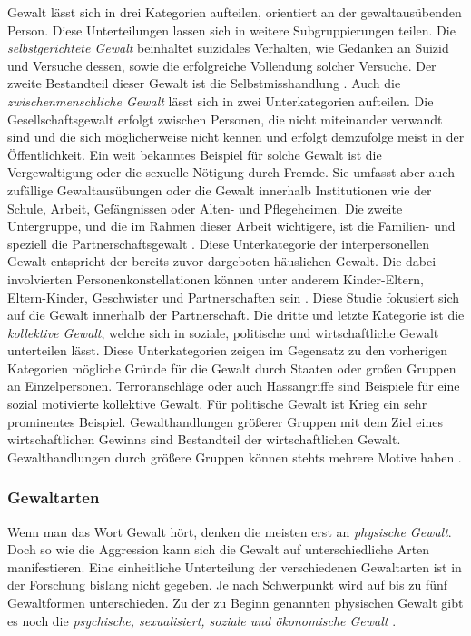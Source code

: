 Gewalt lässt sich in drei Kategorien aufteilen, orientiert an der gewaltausübenden Person. Diese Unterteilungen lassen sich in weitere Subgruppierungen teilen. Die \textit{selbstgerichtete Gewalt} beinhaltet suizidales Verhalten, wie Gedanken an Suizid und Versuche dessen, sowie die erfolgreiche Vollendung solcher Versuche. Der zweite Bestandteil dieser Gewalt ist die Selbstmisshandlung \parencite{Gewaltarten_WHO}. Auch die \textit{zwischenmenschliche Gewalt} lässt sich in zwei Unterkategorien aufteilen. Die Gesellschaftsgewalt erfolgt zwischen Personen, die nicht miteinander verwandt sind und die sich möglicherweise nicht kennen und erfolgt demzufolge meist in der Öffentlichkeit. Ein weit bekanntes Beispiel für solche Gewalt ist die Vergewaltigung oder die sexuelle Nötigung durch Fremde. Sie umfasst aber auch zufällige Gewaltausübungen oder die Gewalt innerhalb Institutionen wie der Schule, Arbeit, Gefängnissen oder Alten- und Pflegeheimen. Die zweite Untergruppe, und die im Rahmen dieser Arbeit wichtigere, ist die Familien- und speziell die Partnerschaftsgewalt \parencite{Gewaltarten_WHO}. Diese Unterkategorie der interpersonellen Gewalt entspricht der bereits zuvor dargeboten häuslichen Gewalt. Die dabei involvierten Personenkonstellationen können unter anderem Kinder-Eltern, Eltern-Kinder, Geschwister und Partnerschaften sein \parencite{Def_Form_Folge_Gewalt}. Diese Studie fokusiert sich auf die Gewalt innerhalb der Partnerschaft. Die dritte und letzte Kategorie ist die \textit{kollektive Gewalt}, welche sich in soziale, politische und wirtschaftliche Gewalt unterteilen lässt. Diese Unterkategorien zeigen im Gegensatz zu den vorherigen Kategorien mögliche Gründe für die Gewalt durch Staaten oder großen Gruppen an Einzelpersonen. Terroranschläge oder auch Hassangriffe sind Beispiele für eine sozial motivierte kollektive Gewalt. Für politische Gewalt ist Krieg ein sehr prominentes Beispiel. Gewalthandlungen größerer Gruppen mit dem Ziel eines wirtschaftlichen Gewinns sind Bestandteil der wirtschaftlichen Gewalt. Gewalthandlungen durch größere Gruppen können stehts mehrere Motive haben \parencite{Gewaltarten_WHO}.


\subsubsection{Gewaltarten}     \label{2.1.2.1}
Wenn man das Wort Gewalt hört, denken die meisten erst an \textit{physische Gewalt}. Doch so wie die Aggression kann sich die Gewalt auf unterschiedliche Arten manifestieren. Eine einheitliche Unterteilung der verschiedenen Gewaltarten ist in der Forschung bislang nicht gegeben. Je nach Schwerpunkt wird auf bis zu fünf Gewaltformen unterschieden. Zu der zu Beginn genannten physischen Gewalt gibt es noch die \textit{psychische, sexualisiert, soziale und ökonomische Gewalt} \parencite{Def_Form_Folge_Gewalt}.

